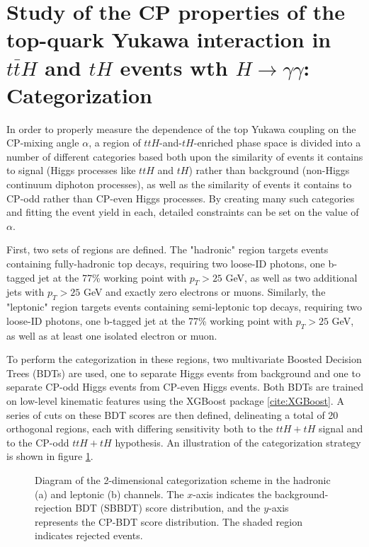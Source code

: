 \section{Study of the CP properties of the top-quark Yukawa interaction in $t\bar{t}H$ and $tH$ events wth $H \rightarrow \gamma \gamma$: Categorization} \label{sec:ttHCPCategorization}

In order to properly measure the dependence of the top Yukawa coupling on the CP-mixing angle $\alpha$, a region of $ttH$-and-$tH$-enriched phase space  is divided into a number of different categories based both upon the similarity of events it contains to signal (Higgs processes like $ttH$ and $tH$) rather than background (non-Higgs continuum diphoton processes), as well as the similarity of events it contains to CP-odd rather than CP-even Higgs processes. By creating many such categories and fitting the event yield in each, detailed constraints can be set on the value of $\alpha$.

First, two sets of regions are defined. The "hadronic" region targets events containing fully-hadronic top decays, requiring two loose-ID photons, one b-tagged jet at the 77\% working point with $p_{T} > 25$ GeV, as well as two additional jets with $p_{T} > 25$ GeV and exactly zero electrons or muons. Similarly, the "leptonic" region targets events containing semi-leptonic top decays, requiring two loose-ID photons, one b-tagged jet at the 77\% working point with $p_{T} > 25$ GeV, as well as at least one isolated electron or muon.

To perform the categorization in these regions, two multivariate Boosted Decision Trees (BDTs) are used, one to separate Higgs events from background and one to separate CP-odd Higgs events from CP-even Higgs events. Both BDTs are trained on low-level kinematic features using the XGBoost package \ref{cite:XGBoost}. A series of cuts on these BDT scores are then defined, delineating a total of 20 orthogonal regions, each with differing sensitivity both to the $ttH+tH$ signal and to the CP-odd $ttH+tH$ hypothesis. An illustration of the categorization strategy is shown in figure \ref{fig:cartoon}.

\begin{figure}[htbp]
  \centering
  \caption{Diagram of the 2-dimensional categorization scheme in the hadronic (a) and leptonic (b) channels. The $x$-axis indicates the background-rejection BDT (SBBDT) score distribution, and the $y$-axis represents the CP-BDT score distribution. The shaded region indicates rejected events.}
  \label{fig:cartoon}
\end{figure}

